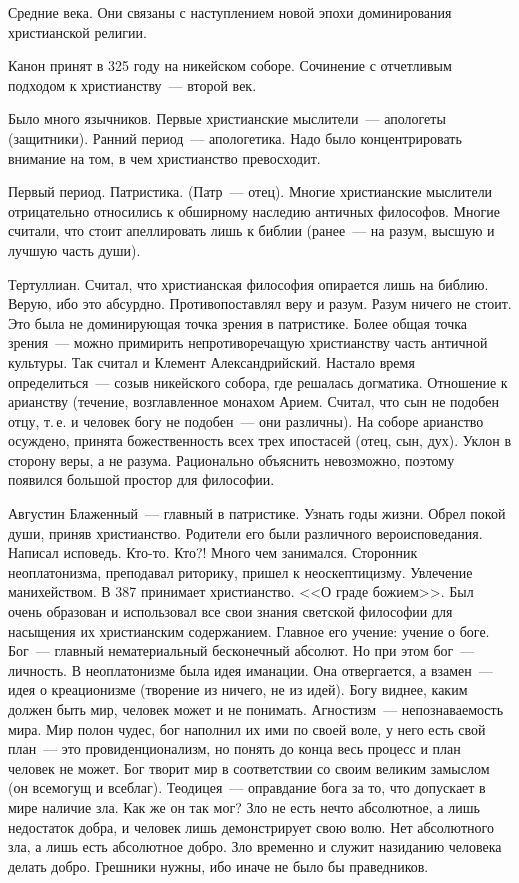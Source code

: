 Средние века.
Они связаны с наступлением новой эпохи доминирования христианской религии.

Канон принят в 325 году на никейском соборе. Сочинение с отчетливым подходом к христианству~--- второй век.

Было много язычников. Первые христианские мыслители~--- апологеты (защитники). Ранний период~--- апологетика. Надо было концентрировать внимание на том, в чем христианство превосходит.

Первый период. Патристика. (Патр~--- отец). Многие христианские мыслители отрицательно относились к обширному наследию античных философов. Многие считали, что стоит апеллировать лишь к библии (ранее~--- на разум, высшую и лучшую часть души). 

Тертуллиан. Считал, что христианская философия опирается лишь на библию. Верую, ибо это абсурдно. Противопоставлял веру и разум. Разум ничего не стоит.
Это была не доминирующая точка зрения в патристике. Более общая точка зрения~--- можно примирить непротиворечащую христианству часть античной культуры. Так считал и Клемент Александрийский.
Настало время определиться~--- созыв никейского собора, где решалась догматика. Отношение к арианству (течение, возглавленное монахом Арием. Считал, что сын не подобен отцу, т.\,е. и человек богу не подобен~--- они различны). На соборе арианство осуждено, принята божественность всех трех ипостасей (отец, сын, дух). Уклон в сторону веры, а не разума. Рационально объяснить невозможно, поэтому появился большой простор для философии.

Августин Блаженный~--- главный в патристике. Узнать годы жизни.
Обрел покой души, приняв христианство. Родители его были различного вероисповедания. Написал исповедь.
Кто-то. Кто?!
Много чем занимался. Сторонник неоплатонизма, преподавал риторику, пришел к неоскептицизму. Увлечение манихейством. В 387 принимает христианство. <<О граде божием>>. Был очень образован и использовал все свои знания светской философии для насыщения их христианским содержанием. Главное его учение: учение о боге. Бог~--- главный нематериальный бесконечный абсолют. Но при этом бог~--- личность. В неоплатонизме была идея иманации. Она отвергается, а взамен~--- идея о креационизме (творение из ничего, не из идей). Богу виднее, каким должен быть мир, человек может и не понимать. Агностизм~--- непознаваемость мира. Мир полон чудес, бог наполнил их ими по своей воле, у него есть свой план~--- это провиденционализм, но понять до конца весь процесс и план человек не может. Бог творит мир в соответствии со своим великим замыслом (он всемогущ и всеблаг). Теодицея~--- оправдание бога за то, что допускает в мире наличие зла. Как же он так мог? Зло не есть нечто абсолютное, а лишь недостаток добра, и человек лишь демонстрирует свою волю. Нет абсолютного зла, а лишь есть абсолютное добро. Зло временно и служит назиданию человека делать добро. Грешники нужны, ибо иначе не было бы праведников.

